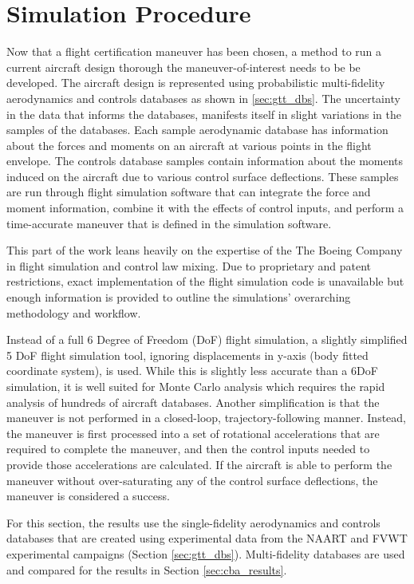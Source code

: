 \section{Simulation Procedure} \label{sec:sim_procedure}

Now that a flight certification maneuver has been chosen, a method to run a current aircraft design thorough the maneuver-of-interest needs to be be developed.
The aircraft design is represented using probabilistic multi-fidelity aerodynamics and controls databases as shown in \ref{sec:gtt_dbs}.
The uncertainty in the data that informs the databases, manifests itself in slight variations in the samples of the databases.
Each sample aerodynamic database has information about the forces and moments on an aircraft at various points in the flight envelope.
The controls database samples contain information about the moments induced on the aircraft due to various control surface deflections. 
These samples are run through flight simulation software that can integrate the force and moment information, combine it with the effects of control inputs, and perform a time-accurate maneuver that is defined in the simulation software. 

This part of the work leans heavily on the expertise of the The Boeing Company in flight simulation and control law mixing.
Due to proprietary and patent restrictions, exact implementation of the flight simulation code is unavailable but enough information is provided to outline the simulations' overarching methodology and workflow.

Instead of a full 6 Degree of Freedom (DoF) flight simulation, a slightly simplified 5 DoF flight simulation tool, ignoring displacements in y-axis (body fitted coordinate system), is used.
While this is slightly less accurate than a 6DoF simulation, it is well suited for Monte Carlo analysis which requires the rapid analysis of hundreds of aircraft databases.
Another simplification is that the maneuver is not performed in a closed-loop, trajectory-following manner. 
Instead, the maneuver is first processed into a set of rotational accelerations that are required to complete the maneuver, and then the control inputs needed to provide those accelerations are calculated. 
If the aircraft is able to perform the maneuver without over-saturating any of the control surface deflections, the maneuver is considered a success.

For this section, the results use the single-fidelity aerodynamics and controls databases that are created using experimental data from the NAART and FVWT experimental campaigns (Section \ref{sec:gtt_dbs}). 
Multi-fidelity databases are used and compared for the results in Section \ref{sec:cba_results}.

